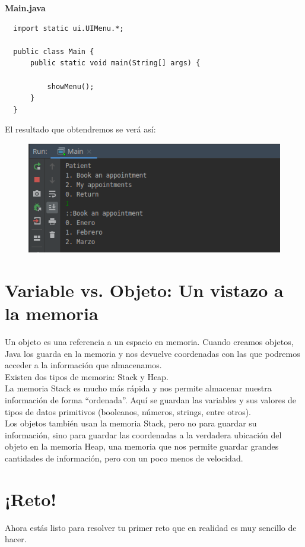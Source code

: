 \documentclass{article}
\begin{document}
\textbf{Main.java}
\begin{verbatim}
  import static ui.UIMenu.*;

  public class Main {
      public static void main(String[] args) {

          showMenu();
      }
  }
\end{verbatim}

El resultado que obtendremos se verá así:
\begin{figure}[h!]
  \centering
  \includegraphics[scale=0.75]{./Pictures/026_resultado_c9.png}
\end{figure}




\section{Variable vs. Objeto: Un vistazo a la memoria}%
Un objeto es una referencia a un espacio en memoria. Cuando creamos objetos,
Java los guarda en la memoria y nos devuelve coordenadas con las que podremos
acceder a la información que almacenamos.\\

Existen dos tipos de memoria: Stack y Heap.\\

La memoria Stack es mucho más rápida y nos permite almacenar nuestra
información de forma “ordenada”. Aquí se guardan las variables y sus valores de
tipos de datos primitivos (booleanos, números, strings, entre otros).\\

Los objetos también usan la memoria Stack, pero no para guardar su información,
sino para guardar las coordenadas a la verdadera ubicación del objeto en la
memoria Heap, una memoria que nos permite guardar grandes cantidades de
información, pero con un poco menos de velocidad.\\


\section{¡Reto!}%
Ahora estás listo para resolver tu primer reto que en realidad es muy sencillo
de hacer.\\
\end{document}
